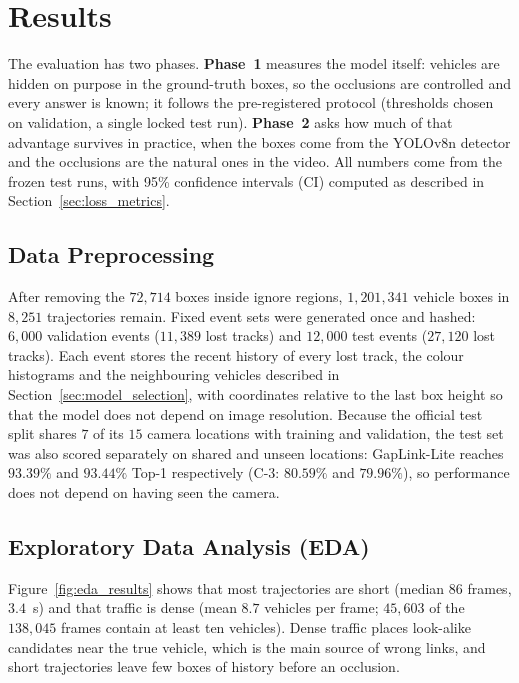 \chapter{Results}
\label{chap:results}

The evaluation has two phases. \textbf{Phase~1} measures the model itself: vehicles are hidden on purpose in the ground-truth boxes, so the occlusions are controlled and every answer is known; it follows the pre-registered protocol (thresholds chosen on validation, a single locked test run). \textbf{Phase~2} asks how much of that advantage survives in practice, when the boxes come from the YOLOv8n detector and the occlusions are the natural ones in the video. All numbers come from the frozen test runs, with 95\% confidence intervals (CI) computed as described in Section~\ref{sec:loss_metrics}.

\section{Data Preprocessing}
\label{sec:data_preprocessing}

After removing the $72{,}714$ boxes inside ignore regions, $1{,}201{,}341$ vehicle boxes in $8{,}251$ trajectories remain. Fixed event sets were generated once and hashed: $6{,}000$ validation events ($11{,}389$ lost tracks) and $12{,}000$ test events ($27{,}120$ lost tracks). Each event stores the recent history of every lost track, the colour histograms and the neighbouring vehicles described in Section~\ref{sec:model_selection}, with coordinates relative to the last box height so that the model does not depend on image resolution. Because the official test split shares $7$ of its $15$ camera locations with training and validation, the test set was also scored separately on shared and unseen locations: GapLink-Lite reaches $93.39\%$ and $93.44\%$ Top-1 respectively (C-3: $80.59\%$ and $79.96\%$), so performance does not depend on having seen the camera.

\section{Exploratory Data Analysis (EDA)}
\label{sec:eda}

Figure~\ref{fig:eda_results} shows that most trajectories are short (median $86$ frames, $3.4$~s) and that traffic is dense (mean $8.7$ vehicles per frame; $45{,}603$ of the $138{,}045$ frames contain at least ten vehicles). Dense traffic places look-alike candidates near the true vehicle, which is the main source of wrong links, and short trajectories leave few boxes of history before an occlusion.

